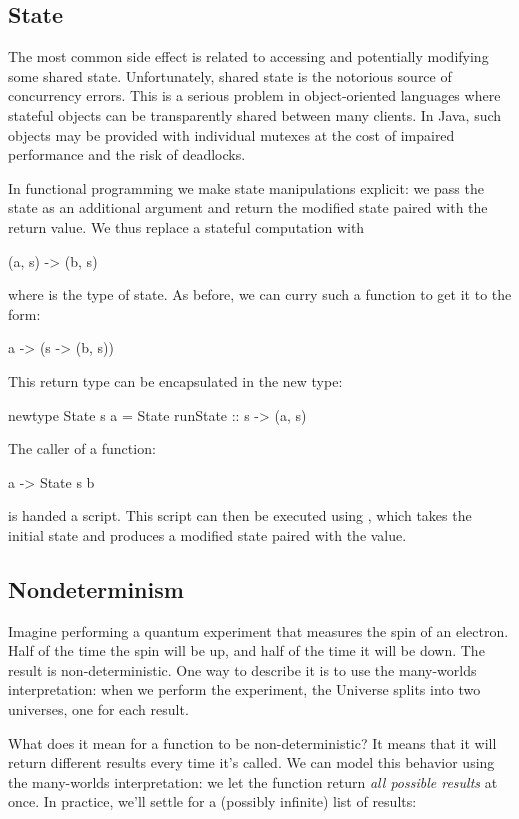 \documentclass[DaoFP]{subfiles}
\begin{document}
\subsection{State}

The most common side effect is related to accessing and potentially modifying some shared state. Unfortunately, shared state is the notorious source of concurrency errors. This is a serious problem in object-oriented languages where stateful objects can be transparently shared between many clients. In Java, such objects may be provided with individual mutexes at the cost of impaired performance and the risk of deadlocks.

In functional programming we make state manipulations explicit: we pass the state as an additional argument and return the modified state paired with the return value. We thus replace a stateful computation  with
\begin{haskell}
(a, s) -> (b, s)
\end{haskell}
where  is the type of state. As before, we can curry such a function to get it to the form:
\begin{haskell}
a -> (s -> (b, s))
\end{haskell}
This return type can be encapsulated in the new type:
\begin{haskell}
newtype State s a = State { runState :: s -> (a, s) }
\end{haskell}
The caller of a function:
\begin{haskell}
a -> State s b
\end{haskell}
is handed a script. This script can then be executed using , which takes the initial state and produces a modified state paired with the value.

\subsection{Nondeterminism}

Imagine performing a quantum experiment that measures the spin of an electron. Half of the time the spin will be up, and half of the time it will be down. The result is non-deterministic. One way to describe it is to use the many-worlds interpretation: when we perform the experiment, the Universe splits into two universes, one for each result.  

What does it mean for a function to be non-deterministic? It means that it will return different results every time it's called. We can model this behavior using the many-worlds interpretation: we let the function return \emph{all possible results} at once. In practice, we'll settle for a (possibly infinite) list of results:
\end{document}
